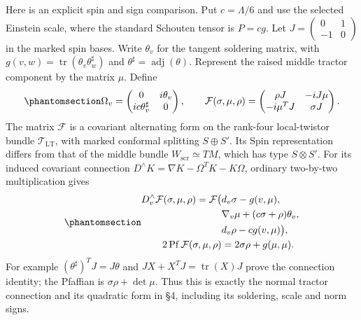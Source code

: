 \documentclass[
  english,
  11pt,
  reqno]{amsart}
\begin{document}
Here is an explicit spin and sign comparison. Put \(c=\Lambda/6\) and
use the selected Einstein scale, where the standard Schouten tensor is
\(P=cg\). Let
\(J=\left(\begin{smallmatrix}0&1\\-1&0\end{smallmatrix}\right)\) in the
marked spin bases. Write \(\theta_v\) for the tangent soldering matrix,
with \(g(v,w)=\operatorname{tr}(\theta_v\theta_w^\sharp)\) and
\(\theta^\sharp=\operatorname{adj}(\theta)\). Represent the raised
middle tractor component by the matrix \(\mu\). Define
\begin{equation}\protect\phantomsection\label{eq:gg-original-infinity-spin-connection}{
 \Omega_v=
 \begin{pmatrix}0&i\theta_v\\ic\theta_v^\sharp&0\end{pmatrix},
 \qquad
 \mathcal F(\sigma,\mu,\rho)=
 \begin{pmatrix}
 \rho J&-iJ\mu\\-i\mu^TJ&\sigma J
 \end{pmatrix}.
}\end{equation} The matrix \(\mathcal F\) is a covariant alternating
form on the rank-four local-twistor bundle \(\mathcal T_{\mathrm{LT}}\),
with marked conformal splitting \(S\oplus S'\). Its Spin representation
differs from that of the middle bundle \(W_{\mathrm{scr}}\simeq TM\),
which has type \(S\otimes S'\). For its induced covariant connection
\(D^{\wedge}K=\nabla K-\Omega^TK-K\Omega\), ordinary two-by-two
multiplication gives
\begin{equation}\protect\phantomsection\label{eq:gg-original-infinity-exterior-square}{
 \begin{aligned}
 D_v^\wedge\mathcal F(\sigma,\mu,\rho)
   =\mathcal F\bigl(&d_v\sigma-g(v,\mu),\\
                   &\nabla_v\mu+(c\sigma+\rho)\theta_v,\\
                   &d_v\rho-cg(v,\mu)\bigr),\\
 2\operatorname{Pf}\mathcal F(\sigma,\mu,\rho)
   &=2\sigma\rho+g(\mu,\mu).
 \end{aligned}
}\end{equation} For example \((\theta^\sharp)^TJ=J\theta\) and
\(JX+X^TJ=\operatorname{tr}(X)J\) prove the connection identity; the
Pfaffian is \(\sigma\rho+\det\mu\). Thus this is exactly the normal
tractor connection and its quadratic form in §4, including its
soldering, scale and norm signs.
\end{document}
